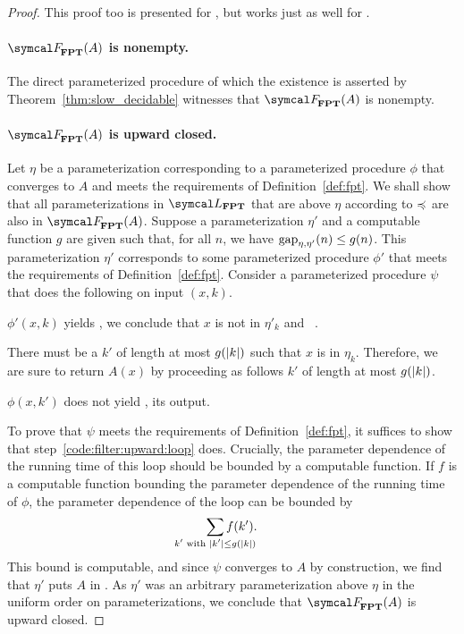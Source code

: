 \begin{proof}
  This proof too is presented for , but works just as well for .

  \paragraph{$\calF_\cl{FPT}(A)$ is nonempty.}
  The direct parameterized procedure of which the existence is asserted by Theorem~\ref{thm:slow_decidable} witnesses that $\calF_\cl{FPT}(A)$ is nonempty.

  \paragraph{$\calF_\cl{FPT}(A)$ is upward closed.}
  Let $\eta$ be a parameterization corresponding to a parameterized procedure $\phi$ that converges to $A$ and meets the requirements of Definition~\ref{def:fpt}.
  We shall show that all parameterizations in $\calL_\cl{FPT}$ that are above $\eta$ according to $\preccurlyeq$ are also in $\calF_\cl{FPT}(A)$.
  Suppose a parameterization $\eta'$ and a computable function $g$ are given such that, for all $n$, we have $\operatorname{gap}_{\eta, \eta'}(n) \le g(n)$.
  This parameterization $\eta'$ corresponds to some parameterized procedure $\phi'$ that meets the requirements of Definition~\ref{def:fpt}.
  Consider a parameterized procedure $\psi$ that does the following on input $(x, k)$.
  \begin{codelisting}
  \item
     $\phi'(x, k)$ yields , we conclude that $x$ is not in $\eta'_k$ and ~.
  \item\label{code:filter:upward:loop}
    There must be a $k'$ of length at most $g(\length{k})$ such that $x$ is in $\eta_k$.
    Therefore, we are sure to return $A(x)$ by proceeding as follows  $k'$ of length at most $g(\length{k})$.
    \begin{codelisting}
    \item {} $\phi(x, k')$ does not yield ,  its output.
    \end{codelisting}
  \end{codelisting}

  To prove that $\psi$ meets the requirements of Definition~\ref{def:fpt}, it suffices to show that step~\ref{code:filter:upward:loop} does.
  Crucially, the parameter dependence of the running time of this loop should be bounded by a computable function.
  If $f$ is a computable function bounding the parameter dependence of the running time of $\phi$, the parameter dependence of the loop can be bounded by
  \begin{equation*}
    \sum_{\mathclap{k'\text{ with }\length{k'} \le g(\length{k})}} f(k').
  \end{equation*}
  This bound is computable, and since $\psi$ converges to $A$ by construction, we find that $\eta'$ puts $A$ in .
  As $\eta'$ was an arbitrary parameterization above $\eta$ in the uniform order on parameterizations, we conclude that $\calF_\cl{FPT}(A)$ is upward closed.


\end{proof}
